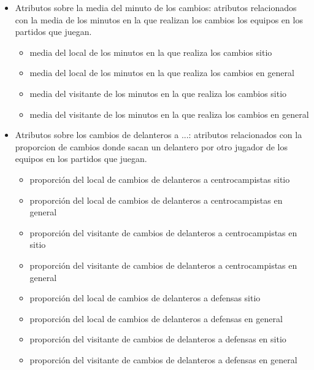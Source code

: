 \begin{itemize}
\begin{itemize}
    \end{itemize}
    \item Atributos sobre la media del minuto de los cambios: atributos relacionados con la media de los minutos en la que realizan los cambios los equipos en los partidos que juegan.
    \begin{itemize}
        \item media del local de los minutos en la que realiza los cambios sitio
        \item media del local de los minutos en la que realiza los cambios en general
        \item media del visitante de los minutos en la que realiza los cambios sitio
        \item media del visitante de los minutos en la que realiza los cambios en general
    \end{itemize}
    \item Atributos sobre los cambios de delanteros a ...: atributos relacionados con la proporcion de cambios donde sacan un delantero por otro jugador de los equipos en los partidos que juegan.
    \begin{itemize}
        \item proporción del local de cambios de delanteros a centrocampistas sitio
        \item proporción del local de cambios de delanteros a centrocampistas en general
        \item proporción del visitante de cambios de delanteros a centrocampistas en sitio
        \item proporción del visitante de cambios de delanteros a centrocampistas en general
        \item proporción del local de cambios de delanteros a defensas sitio
        \item proporción del local de cambios de delanteros a defensas en general
        \item proporción del visitante de cambios de delanteros a defensas en sitio
        \item proporción del visitante de cambios de delanteros a defensas en general
        

\end{itemize}
\end{itemize}
